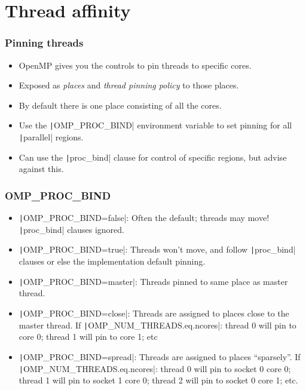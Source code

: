 \documentclass{beamer}
\begin{document}
\section{Thread affinity}
\begin{frame}
\frametitle{Pinning threads}
\begin{itemize}
  \item OpenMP gives you the controls to pin threads to specific cores.
  \item Exposed as \emph{places} and \emph{thread pinning policy} to those places.
  \item By default there is one place consisting of all the cores.
  \item Use the \texttt|OMP_PROC_BIND| environment variable to set pinning for all \texttt|parallel| regions.
  \item Can use the \texttt|proc_bind| clause for control of specific regions, but advise against this.
\end{itemize}
\end{frame}

\begin{frame}
\frametitle{OMP\_PROC\_BIND}
\begin{itemize}
  \item \texttt|OMP_PROC_BIND=false|: Often the default; threads may move! \texttt|proc_bind| clauses ignored.
  \item \texttt|OMP_PROC_BIND=true|: Threads won't move, and follow \texttt|proc_bind| clauses or else the implementation default pinning.
  \item \texttt|OMP_PROC_BIND=master|: Threads pinned to same place as master thread.
  \item \texttt|OMP_PROC_BIND=close|: Threads are assigned to places close to the master thread.
  If \texttt|OMP_NUM_THREADS.eq.ncores|: thread 0 will pin to core 0; thread 1 will pin to core 1; etc
  \item \texttt|OMP_PROC_BIND=spread|: Threads are assigned to places ``sparsely''.
  If \texttt|OMP_NUM_THREADS.eq.ncores|: thread 0 will pin to socket 0 core 0; thread 1 will pin to socket 1 core 0; thread 2 will pin to socket 0 core 1; etc.
\end{itemize}
\end{frame}
\end{document}
